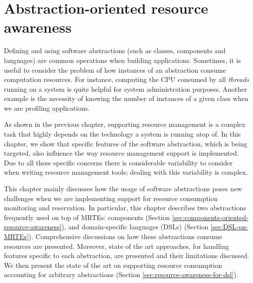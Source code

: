 \chapter{Abstraction-oriented resource awareness}
\label{chap:abstractions_and_resource_management}


Defining and using software abstractions (such as classes, components and languages) are common operations when building applications.
Sometimes, it is useful to consider the problem of how instances of an abstraction consume computation resources.
For instance, computing the CPU consumed by all \textit{threads} running on a system is quite helpful for system administration purposes.
Another example is the necessity of knowing the number of instances of a given class when we are profiling applications.

As shown in the previous chapter, supporting resource management is a complex task that highly depends on the technology a system is running atop of.
In this chapter, we show that specific features of the software abstraction, which is being targeted, also influence the way resource management support is implemented.
Due to all these specific concerns there is considerable variability to consider when writing resource management tools; dealing with this variability is complex.


This chapter mainly discusses how the usage of software abstractions poses new challenges when we are implementing support for resource consumption monitoring and reservation.
In particular, this chapter describes two abstractions frequently used on top of MRTEs: components (Section \ref{sec:components-oriented-resource-awareness}), and domain-specific languages (DSLs) (Section \ref{sec:DSL-on-MRTEs}).
Comprehensive discussions on how these abstractions consume resources are presented.
Moreover, state of the art approaches, for handling features specific to each abstraction, are presented and their limitations discussed.
We then present the state of the art on supporting resource consumption accounting for arbitrary abstractions (Section \ref{sec:resource-awareness-for-dsl}).

